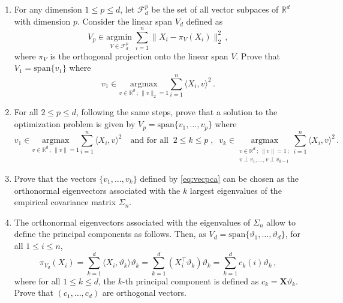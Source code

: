 \documentclass[a4paper,10pt,fleqn]{article}
\newcommand{\eqsp}{\,}
\newcommand{\calF}{\mathcal{F}}
\newcommand{\rset}{\ensuremath{\mathbb{R}}}
\newcommand{\1}{\ensuremath{\mathbbm{1}}}
\newcommand{\bfX}{X}
\newcommand{\bfs}{\Sigma}
\begin{document}
\begin{enumerate}
\item  For any dimension $1\leqslant p \leqslant  d$, let $\calF_d^p$ be the set of all vector subpaces of $\rset^d$ with dimension $p$. Consider the linear span $V_d$ defined as
$$
V_p \in \underset{V\in \calF_d^p}{\mathrm{argmin}} \;\sum_{i=1}^n\|X_i - \pi_V(X_i)\|_2^2\eqsp,
$$
where $\pi_V$ is the orthogonal projection onto the linear span $V$. Prove that $V_1 = \mathrm{span}\{v_1\}$ where
$$
v_1 \in \underset{v \in \rset^d\,;\, \|v\|_2=1}{\mathrm{argmax}} \sum_{i=1}^n   \langle X_i, v \rangle^2\eqsp.
$$
\item For all $2\leqslant p \leqslant d$, following the same steps, prove that a solution to the optimization problem is given by $V_p = \mathrm{span}\{v_1, \ldots, v_p\}$ where
\begin{equation}
\label{eq:vecpca}
v_1 \in \underset{v\in \rset^d\,;\,\|v\|=1}{\mathrm{argmax}} \sum_{i=1}^n\langle X_i,v\rangle^2 \quad\mbox{and for all}\;\; 2\leqslant k \leqslant p\;,\;\; v_k \in \underset{\substack{v\in \rset^d\,;\,\|v\|=1\,;\\ v\perp v_1,\ldots,v\perp v_{k-1}}}{\mathrm{argmax}}\sum_{i=1}^n\langle X_i,v\rangle^2\eqsp.
\end{equation}
\item Prove that the vectors $\{v_1, \ldots , v_k\}$ defined by \eqref{eq:vecpca} can be chosen as the orthonormal eigenvectors associated with the $k$ largest eigenvalues of the empirical covariance matrix $\bfs_n$.
\item The orthonormal eigenvectors associated with the eigenvalues of $\Sigma_n$ allow to define the principal components as follows. Then, as $V_d = \mathrm{span}\{\vartheta_1, \ldots, \vartheta_d\}$, for all $1\leqslant i\leqslant n$,
$$
\pi_{V_d}(X_i) = \sum_{k=1}^d \langle X_i,\vartheta_k\rangle \vartheta_k  = \sum_{k=1}^d (X^\top_i \vartheta_k)\vartheta_k = \sum_{k=1}^d c_k(i)\vartheta_k\eqsp,
$$
where for all $1\leqslant k \leqslant d$, the $k$-th principal component is defined as $c_k = \mathbf{X}\vartheta_k$. Prove that $(c_1,\ldots,c_d)$ are orthogonal vectors.
\end{enumerate}
\end{document}
